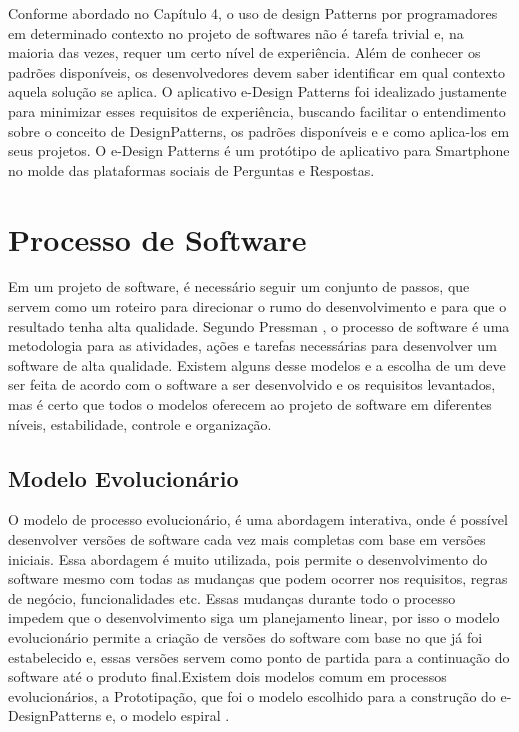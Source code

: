 Conforme abordado no Capítulo 4, o uso de design Patterns por programadores em determinado contexto no projeto de softwares não é tarefa trivial e, na maioria das vezes, requer um certo nível de experiência. Além de conhecer os padrões disponíveis, os desenvolvedores devem saber identificar em qual contexto aquela solução se aplica. O aplicativo e-Design Patterns foi idealizado justamente para minimizar esses requisitos de experiência, buscando facilitar o entendimento sobre o conceito de DesignPatterns, os padrões disponíveis e e como aplica-los em seus projetos. O e-Design Patterns é um protótipo de aplicativo para Smartphone no molde das plataformas sociais de Perguntas e Respostas.

\section{Processo de Software}

Em um projeto de software, é necessário seguir um conjunto de passos, que servem como um roteiro para direcionar o rumo do desenvolvimento e para que o resultado tenha alta qualidade. Segundo Pressman \cite{pressman2016engenharia}, o processo de software é uma metodologia para as atividades, ações e tarefas necessárias para desenvolver um software de alta qualidade. Existem alguns desse modelos e a escolha de um deve ser feita de acordo com o software a ser desenvolvido e os requisitos levantados, mas é certo que todos o modelos oferecem ao projeto de software em diferentes níveis, estabilidade, controle e organização.

\subsection{Modelo Evolucionário}

O modelo de processo evolucionário, é uma abordagem interativa, onde é possível desenvolver versões de software cada vez mais completas com base em versões iniciais. Essa abordagem é muito utilizada, pois permite o desenvolvimento do software  mesmo com todas as mudanças que podem ocorrer nos requisitos, regras de negócio, funcionalidades etc. Essas mudanças durante todo o processo impedem que o desenvolvimento siga um planejamento linear, por isso o modelo evolucionário permite a criação de versões do software com base no que já foi estabelecido e, essas versões servem como ponto de partida para a continuação do software até o produto final.Existem dois modelos comum em processos evolucionários, a Prototipação, que foi o modelo escolhido para a construção do e-DesignPatterns e, o modelo espiral \cite{pressman2016engenharia}. 


